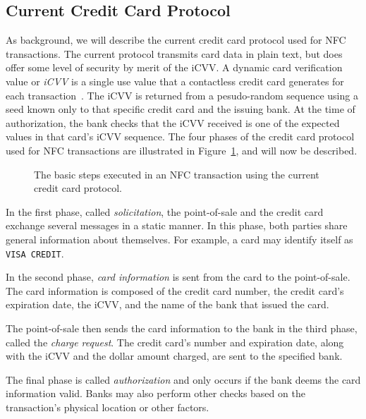 \documentclass{sig-alternate}
\begin{document}
\subsection{Current Credit Card Protocol}
\label{sec:currentCC}
As background, we will describe the current credit card protocol used for NFC transactions. The current protocol transmits card data in plain text, but does offer some level of security by merit of the iCVV. A dynamic card verification value or \textit{iCVV} is a single use value that a contactless credit card generates for each transaction~\cite{wiki:iCVV}. The iCVV is returned from a pesudo-random sequence using a seed known only to that specific credit card and the issuing bank. At the time of authorization, the bank checks that the iCVV received is one of the expected values in that card's iCVV sequence. The four phases of the credit card protocol used for NFC transactions are illustrated in Figure~\ref{fig:currentCC}, and will now be described.

\begin{figure}
\centering
{}
\caption{The basic steps executed in an NFC transaction using the current credit card protocol.
\cite{CC2016}}
\label{fig:currentCC}
\end{figure}

In the first phase, called \textit{solicitation}, the point-of-sale and the credit card exchange several messages in a static manner. In this phase, both parties share general information about themselves. For example, a card may identify itself as \texttt{VISA CREDIT}.

In the second phase, \textit{card information} is sent from the card to the point-of-sale. The card information is composed of the credit card number, the credit card's expiration date, the iCVV, and the name of the bank that issued the card.

The point-of-sale then sends the card information to the bank in the third phase, called the \textit{charge request}. The credit card's number and expiration date, along with the iCVV and the dollar amount charged, are sent to the specified bank.

The final phase is called \textit{authorization} and only occurs if the bank deems the card information valid. Banks may also perform other checks based on the transaction's physical location or other factors.
\end{document}
